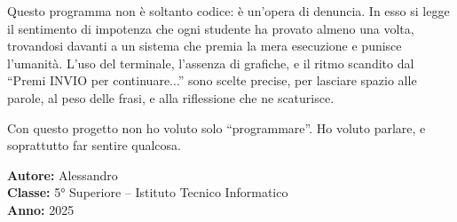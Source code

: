 \documentclass[12pt]{article}
\begin{document}
\noindent
Questo programma non è soltanto codice: è un’opera di denuncia. In esso si legge il sentimento di impotenza che ogni studente ha provato almeno una volta, trovandosi davanti a un sistema che premia la mera esecuzione e punisce l’umanità. L’uso del terminale, l’assenza di grafiche, e il ritmo scandito dal ``Premi INVIO per continuare...'' sono scelte precise, per lasciare spazio alle parole, al peso delle frasi, e alla riflessione che ne scaturisce.

\vspace{1em}
\noindent
Con questo progetto non ho voluto solo “programmare”. Ho voluto parlare, e soprattutto far sentire qualcosa. 

\vfill
\noindent\textbf{Autore:} Alessandro \\
\textbf{Classe:} 5° Superiore – Istituto Tecnico Informatico \\
\textbf{Anno:} 2025
\end{document}
